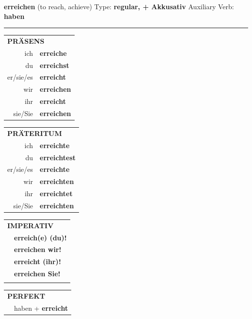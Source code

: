 \documentclass[10pt,a4paper]{revtex4-2}
\begin{document}
\begin{verbbox-acc}
    {\Large \bf erreichen} (to reach, achieve) \hfill Type: \textbf{regular, + Akkusativ} \hfill Auxiliary Verb: \textbf{haben} 
    
     \vspace{5pt}

    \hrule
    
    \vspace{5pt}

  \begin{tabular}{rl}
     \multicolumn{2}{l}{\textbf{PRÄSENS} }\\
    ich & \textbf{erreiche}\\
    du & \textbf{erreichst}\\
    er/sie/es & \textbf{erreicht}\\
    wir & \textbf{erreichen}\\
    ihr & \textbf{erreicht}\\
    sie/Sie & \textbf{erreichen}\\
  \end{tabular}
  \hfill
     \begin{tabular}{rl}
    \multicolumn{2}{l}{\textbf{PRÄTERITUM} }\\
    ich & \textbf{erreichte}\\
    du & \textbf{erreichtest}\\
    er/sie/es & \textbf{erreichte}\\
    wir & \textbf{erreichten}\\
    ihr & \textbf{erreichtet}\\
    sie/Sie & \textbf{erreichten}\\
  \end{tabular}
  \hfill
  \begin{tabular}{rl}
     \multicolumn{2}{l}{\textbf{IMPERATIV} }\\
   & \textbf{erreich(e) (du)!}\\
   & \textbf{erreichen wir!}\\
   & \textbf{erreicht (ihr)!}\\
   & \textbf{erreichen Sie!}\\
   & \vspace{10pt}
  \end{tabular}

    \vspace{10pt}

 \begin{tabular}{rl}
     \multicolumn{2}{l}{\textbf{PERFEKT}}\\
  &  haben + \textbf{erreicht}\\
  \end{tabular}
\hfill
   \begin{tabular}{rl}
   

\end{tabular}
\end{verbbox-acc}
\end{document}
